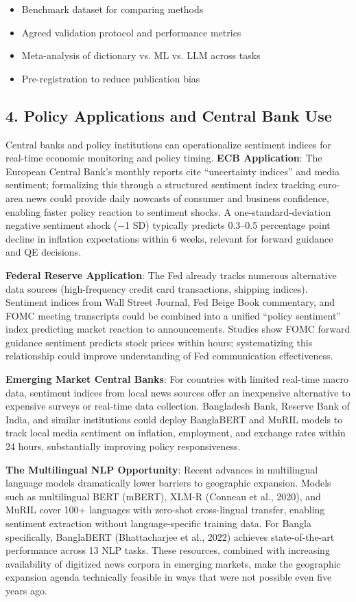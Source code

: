\documentclass[11pt,twocolumn]{article}
\begin{document}
\begin{itemize}
\item Benchmark dataset for comparing methods
\item Agreed validation protocol and performance metrics
\item Meta-analysis of dictionary vs. ML vs. LLM across tasks
\item Pre-registration to reduce publication bias
\end{itemize}

\subsection{4. Policy Applications and Central Bank Use}

Central banks and policy institutions can operationalize sentiment indices for real-time economic monitoring and policy timing. \textbf{ECB Application}: The European Central Bank's monthly reports cite ``uncertainty indices'' and media sentiment; formalizing this through a structured sentiment index tracking euro-area news could provide daily nowcasts of consumer and business confidence, enabling faster policy reaction to sentiment shocks. A one-standard-deviation negative sentiment shock ($-$1 SD) typically predicts 0.3--0.5 percentage point decline in inflation expectations within 6 weeks, relevant for forward guidance and QE decisions.

\textbf{Federal Reserve Application}: The Fed already tracks numerous alternative data sources (high-frequency credit card transactions, shipping indices). Sentiment indices from Wall Street Journal, Fed Beige Book commentary, and FOMC meeting transcripts could be combined into a unified ``policy sentiment'' index predicting market reaction to announcements. Studies show FOMC forward guidance sentiment predicts stock prices within hours; systematizing this relationship could improve understanding of Fed communication effectiveness.

\textbf{Emerging Market Central Banks}: For countries with limited real-time macro data, sentiment indices from local news sources offer an inexpensive alternative to expensive surveys or real-time data collection. Bangladesh Bank, Reserve Bank of India, and similar institutions could deploy BanglaBERT and MuRIL models to track local media sentiment on inflation, employment, and exchange rates within 24 hours, substantially improving policy responsiveness.

\textbf{The Multilingual NLP Opportunity}: Recent advances in multilingual language models dramatically lower barriers to geographic expansion. Models such as multilingual BERT (mBERT), XLM-R (Conneau et al., 2020), and MuRIL cover 100+ languages with zero-shot cross-lingual transfer, enabling sentiment extraction without language-specific training data. For Bangla specifically, BanglaBERT (Bhattacharjee et al., 2022) achieves state-of-the-art performance across 13 NLP tasks. These resources, combined with increasing availability of digitized news corpora in emerging markets, make the geographic expansion agenda technically feasible in ways that were not possible even five years ago.
\end{document}
